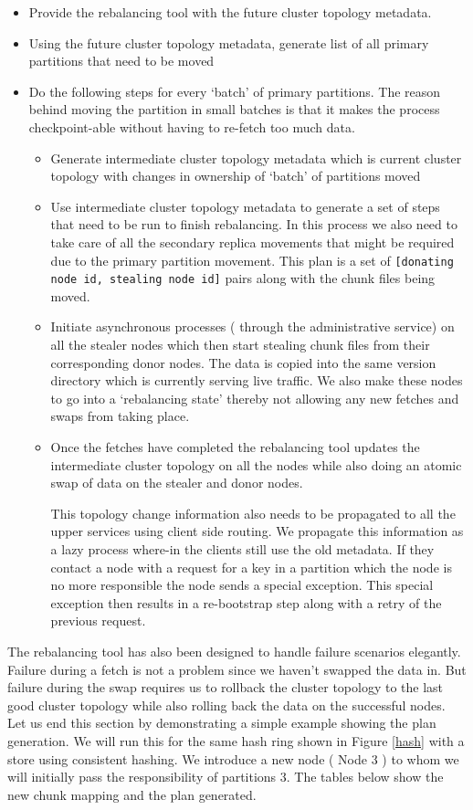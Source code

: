 \documentclass[10pt,twocolumn,preprint,natbib,authoryear]{sigplanconf}
\begin{document}
\begin{itemize}
	\item Provide the rebalancing tool with the future cluster topology metadata.
	\item Using the future cluster topology metadata, generate list of all primary partitions that need to be moved
	\item Do the following steps for every `batch' of primary partitions. The reason behind moving the partition in small batches is that it makes the process checkpoint-able without having to re-fetch too much data. 
		\begin{itemize}
			\item Generate intermediate cluster topology metadata which is current cluster topology with changes in ownership of `batch' of partitions moved
			\item Use intermediate cluster topology metadata to generate a set of steps that need to be run to finish rebalancing. In this process we also need to take care of all the secondary replica movements that might be required due to the primary partition movement. This plan is a set of \verb=[donating node id, stealing node id]= pairs along with the chunk files being moved. 
			\item Initiate asynchronous processes ( through the administrative service) on all the stealer nodes which then start stealing chunk files from their corresponding donor nodes. The data is copied into the same version directory which is currently serving live traffic. We also make these nodes to go into a `rebalancing state' thereby not allowing any new fetches and swaps from taking place. 
			\item Once the fetches have completed the rebalancing tool updates the intermediate cluster topology on all the nodes while also doing an atomic swap of data on the stealer and donor nodes. 
			
			This topology change information also needs to be propagated to all the upper services using client side routing. We propagate this information as a lazy process where-in the clients still use the old metadata. If they contact a node with a request for a key in a partition which the node is no more responsible the node sends a special exception. This special exception then results in a re-bootstrap step along with a retry of the previous request.
		\end{itemize}
\end{itemize}

The rebalancing tool has also been designed to handle failure scenarios elegantly. Failure during a fetch is not a problem since we haven't swapped the data in. But failure during the swap requires us to rollback the cluster topology to the last good cluster topology while also rolling back the data on the successful nodes. Let us end this section by demonstrating a simple example showing the plan generation. We will run this for the same hash ring shown in Figure \ref{hash} with a store using consistent hashing. We introduce a new node ( Node 3 ) to whom we will initially pass the responsibility of partitions 3. The tables below show the new chunk mapping and the plan generated. 
\end{document}
